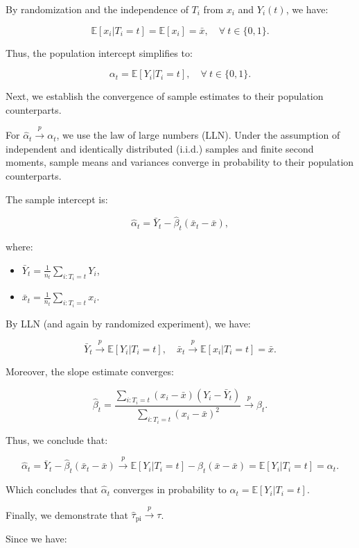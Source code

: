 \documentclass{article}
\begin{document}
By randomization and the independence of \(T_i\) from \(x_i\) and \(Y_i(t)\), we have:

\[
\mathbb{E}[x_i | T_i = t] = \mathbb{E}[x_i] = \bar{x}, \quad \forall \ t \in \{0, 1\}.
\]

Thus, the population intercept simplifies to:

\[
\alpha_t = \mathbb{E}[Y_i | T_i = t], \quad \forall \ t \in \{0, 1\}.
\]

Next, we establish the convergence of sample estimates to their population counterparts.

For \(\hat{\alpha}_t \xrightarrow{p} \alpha_t\), we use the law of large numbers (LLN). Under the assumption of independent and identically distributed (i.i.d.) samples and finite second moments, sample means and variances converge in probability to their population counterparts.

The sample intercept is:

\[
\hat{\alpha}_t = \bar{Y}_t - \hat{\beta}_t (\bar{x}_t - \bar{x}),
\]

where:

\begin{itemize}
    \item \(\bar{Y}_t = \frac{1}{n_t} \sum_{i: T_i = t} Y_i\),
    \item \(\bar{x}_t = \frac{1}{n_t} \sum_{i: T_i = t} x_i\).
\end{itemize}

By LLN (and again by randomized experiment), we have:

\[
\bar{Y}_t \xrightarrow{p} \mathbb{E}[Y_i | T_i = t], \quad \bar{x}_t \xrightarrow{p} \mathbb{E}[x_i | T_i = t] = \bar{x}.
\]

Moreover, the slope estimate converges:

\[
\hat{\beta}_t = \frac{\sum_{i: T_i = t} (x_i - \bar{x}) (Y_i - \bar{Y}_t)}{\sum_{i: T_i = t} (x_i - \bar{x})^2} \xrightarrow{p} \beta_t.
\]

Thus, we conclude that:

\[
\hat{\alpha}_t = \bar{Y}_t - \hat{\beta}_t (\bar{x}_t - \bar{x}) \xrightarrow{p} \mathbb{E}[Y_i | T_i = t] - \beta_t ( \bar{x} - \bar{x} ) = \mathbb{E}[Y_i | T_i = t] = \alpha_t.
\]

Which concludes that \(\hat{\alpha}_t\) converges in probability to \(\alpha_t = \mathbb{E}[Y_i | T_i = t]\).

Finally, we demonstrate that \(\hat{\tau}_{\text{pi}} \xrightarrow{p} \tau\).

Since we have:
\end{document}
